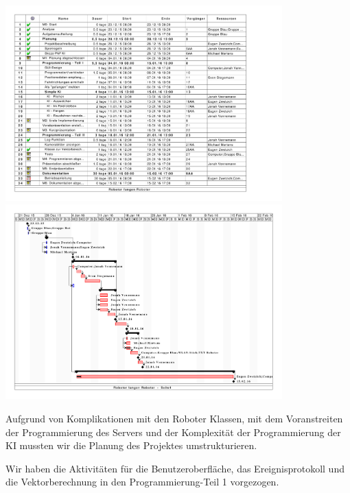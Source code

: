 \begin{center}
		\includegraphics[width=0.8\textwidth]{Bilder/GanttDiagramm_[Page1].pdf}
		\includegraphics[width=0.8\textwidth]{Bilder/GanttDiagramm_[Page2].pdf}
\end{center}
\newpage
Aufgrund von Komplikationen mit den Roboter Klassen, mit dem Voranstreiten der Programmierung des Servers und der Komplexität der Programmierung der KI mussten wir die Planung des Projektes umstrukturieren.

Wir haben die Aktivitäten für die Benutzeroberfläche, das Ereignisprotokoll und die Vektorberechnung in den Programmierung-Teil 1 vorgezogen.


